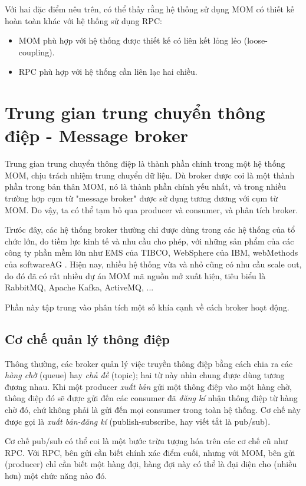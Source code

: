 \documentclass{article}
\begin{document}
Với hai đặc điểm nêu trên, có thể thấy rằng hệ thống sử dụng MOM có thiết kế
hoàn toàn khác với hệ thống sử dụng RPC:

\begin{itemize}
    \item MOM phù hợp với hệ thống được thiết kế có liên kết lỏng lẻo
        (loose-coupling).
    \item RPC phù hợp với hệ thống cần liên lạc hai chiều.
\end{itemize}

\section{Trung gian trung chuyển thông điệp - Message broker}

Trung gian trung chuyển thông điệp là thành phần chính trong một hệ thống MOM,
chịu trách nhiệm trung chuyển dữ liệu. Dù broker được coi là một thành phần
trong bản thân MOM, nó là thành phần chính yếu nhất, và trong nhiều trường hợp
cụm từ "message broker" được sử dụng tương đương với cụm từ MOM. Do vậy, ta có
thể tạm bỏ qua producer và consumer, và phân tích broker.

Trưóc đây, các hệ thống broker thường chỉ được dùng trong các hệ thống của tổ
chức lớn, do tiềm lực kinh tế và nhu cầu cho phép, với những sản phẩm của các
công ty phần mềm lớn như EMS của TIBCO, WebSphere của IBM, webMethods của
softwareAG \cite{Kleppmann17C}. Hiện nay, nhiều hệ thống vừa và nhỏ cũng có nhu
cầu scale out, do đó đã có rất nhiều dự án MOM mã nguồn mở xuất hiện, tiêu biểu
là RabbitMQ, Apache Kafka, ActiveMQ, ...

Phần này tập trung vào phân tích một số khía cạnh về cách broker hoạt động.

\subsection{Cơ chế quản lý thông điệp}

Thông thường, các broker quản lý việc truyền thông điệp bằng cách chia ra các
\emph{hàng chờ} (queue) hay \emph{chủ đề} (topic); hai từ này nhìn chung được
dùng tương đương nhau. Khi một producer \emph{xuất bản} gửi một thông điệp vào
một hàng chờ, thông điệp đó sẽ được gửi đến các consumer đã \emph{đăng kí} nhận
thông điệp từ hàng chờ đó, chứ không phải là gửi đến mọi consumer trong toàn hệ
thống. Cơ chế này được gọi là \emph{xuất bản-đăng kí} (publish-subscribe, hay
viết tắt là pub/sub).

Cơ chế pub/sub có thể coi là một bước trừu tượng hóa trên các cơ chế cũ như RPC.
Với RPC, bên gửi cần biết chính xác điểm cuối, nhưng với MOM, bên gửi (producer)
chỉ cần biết một hàng đợi, hàng đợi này có thể là đại diện cho (nhiều hơn) một
chức năng nào đó.
\end{document}

